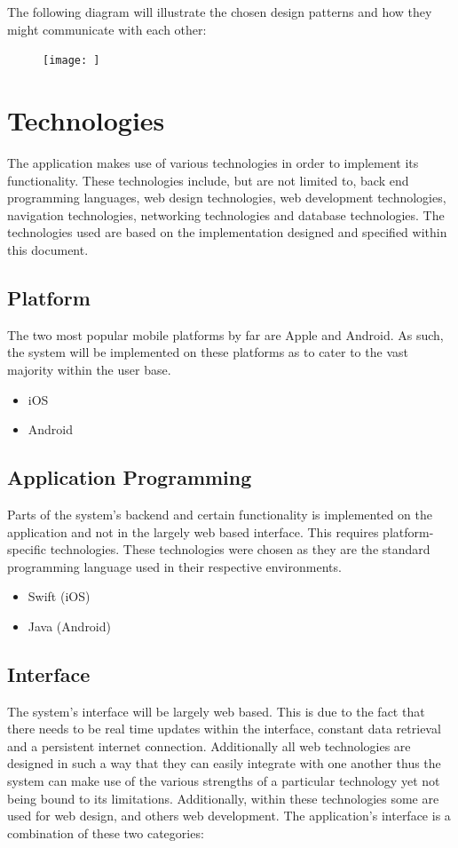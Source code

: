 \documentclass{article}
\begin{document}
The following diagram will illustrate the chosen design patterns and how they might communicate with each other:
	\begin{figure}[h]
  		\texttt{[image: ]}
	\end{figure}

\section{Technologies}
The application makes use of various technologies in order to implement its functionality. These technologies include, but are not limited to, back end programming languages, web design technologies, web development technologies, navigation technologies, networking technologies and database technologies.  The technologies used are based on the implementation designed and specified within this document.  
	\subsection{Platform}
The two most popular mobile platforms by far are Apple and Android.  As such, the system will be implemented on these platforms as to cater to the vast majority within the user base. 
		\begin{itemize}
			\item iOS
			\item Android
		\end{itemize}
	\subsection{Application Programming}
Parts of the system's backend and certain functionality is implemented on the application and not in the largely web based interface.  This requires platform-specific technologies. These technologies were chosen as they are the standard programming language used in their respective environments.
		\begin{itemize}
			\item Swift (iOS)
			\item Java (Android)
		\end{itemize}
	\subsection{Interface}
The system's interface will be largely web based. This is due to the fact that there needs to be real time updates within the interface, constant data retrieval and a persistent internet connection.  Additionally all web technologies are designed in such a way that they can easily integrate with one another thus the system can make use of the various strengths of a particular technology yet not being bound to its limitations.  Additionally, within these technologies some are used for web design, and others web development.  The application's interface is a combination of these two categories:
\end{document}

